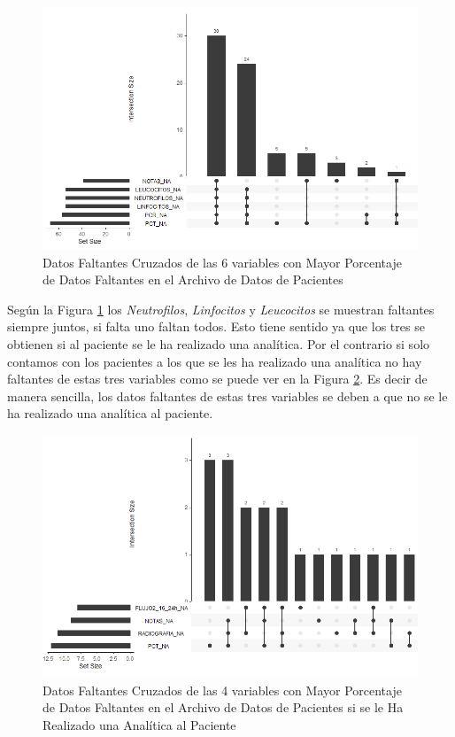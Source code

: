 \begin{figure}[H]
    \centering
    \includegraphics[scale = 0.70]{./img/missig-data-descriptive-cross.png}
    \caption{Datos Faltantes Cruzados de las 6 variables con Mayor Porcentaje de Datos Faltantes en el Archivo de Datos de Pacientes}
    \label{fig:missing-descriptive-cross}
\end{figure}

Según la Figura \ref{fig:missing-descriptive-cross} los \textit{Neutrofilos}, \textit{Linfocitos} y \textit{Leucocitos} se muestran faltantes siempre juntos, si falta uno faltan todos. Esto tiene sentido ya que los tres se obtienen si al paciente se le ha realizado una analítica. Por el contrario si solo contamos con los pacientes a los que se les ha realizado una analítica no hay faltantes de estas tres variables como se puede ver en la Figura \ref{fig:missing-descriptive-cross-analitica}. Es decir de manera sencilla, los datos faltantes de estas tres variables se deben a que no se le ha realizado una analítica al paciente.

\begin{figure}[H]
    \centering
    \includegraphics[scale = 0.70]{./img/missig-data-descriptive-cross-anal.png}
    \caption{Datos Faltantes Cruzados de las 4 variables con Mayor Porcentaje de Datos Faltantes en el Archivo de Datos de Pacientes si se le Ha Realizado una Analítica al Paciente}
    \label{fig:missing-descriptive-cross-analitica}
\end{figure}
\newpage




